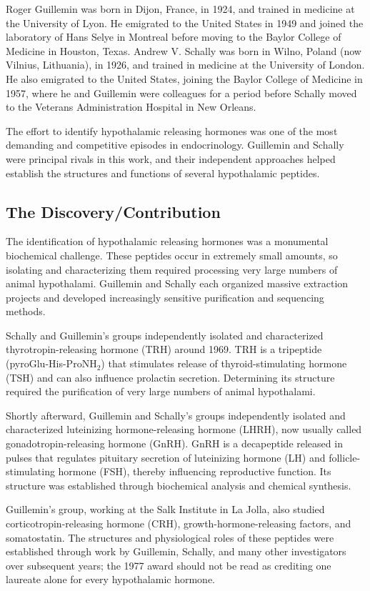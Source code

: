 Roger Guillemin was born in Dijon, France, in 1924, and trained in medicine at the University of Lyon. He emigrated to the United States in 1949 and joined the laboratory of Hans Selye in Montreal before moving to the Baylor College of Medicine in Houston, Texas. Andrew V. Schally was born in Wilno, Poland (now Vilnius, Lithuania), in 1926, and trained in medicine at the University of London. He also emigrated to the United States, joining the Baylor College of Medicine in 1957, where he and Guillemin were colleagues for a period before Schally moved to the Veterans Administration Hospital in New Orleans.

The effort to identify hypothalamic releasing hormones was one of the most demanding and competitive episodes in endocrinology. Guillemin and Schally were principal rivals in this work, and their independent approaches helped establish the structures and functions of several hypothalamic peptides.

\subsection{The Discovery/Contribution}

The identification of hypothalamic releasing hormones was a monumental biochemical challenge. These peptides occur in extremely small amounts, so isolating and characterizing them required processing very large numbers of animal hypothalami. Guillemin and Schally each organized massive extraction projects and developed increasingly sensitive purification and sequencing methods.

Schally and Guillemin's groups independently isolated and characterized thyrotropin-releasing hormone (TRH) around 1969. TRH is a tripeptide (pyroGlu-His-ProNH$_2$) that stimulates release of thyroid-stimulating hormone (TSH) and can also influence prolactin secretion. Determining its structure required the purification of very large numbers of animal hypothalami.

Shortly afterward, Guillemin and Schally's groups independently isolated and characterized luteinizing hormone-releasing hormone (LHRH), now usually called gonadotropin-releasing hormone (GnRH). GnRH is a decapeptide released in pulses that regulates pituitary secretion of luteinizing hormone (LH) and follicle-stimulating hormone (FSH), thereby influencing reproductive function. Its structure was established through biochemical analysis and chemical synthesis.

Guillemin's group, working at the Salk Institute in La Jolla, also studied corticotropin-releasing hormone (CRH), growth-hormone-releasing factors, and somatostatin. The structures and physiological roles of these peptides were established through work by Guillemin, Schally, and many other investigators over subsequent years; the 1977 award should not be read as crediting one laureate alone for every hypothalamic hormone.

